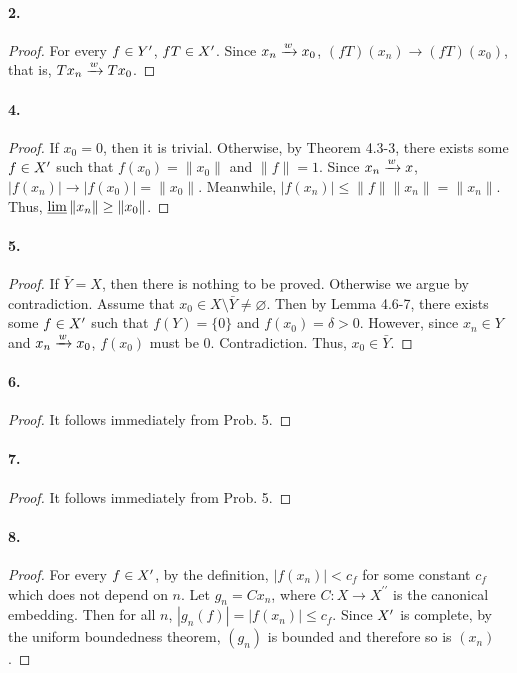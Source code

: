   \paragraph{2.}
  \begin{proof}
    For every $f\in Y^\prime$, $fT\in X^\prime$. Since $x_n\xrightarrow{w} x_0$, $(fT)(x_n)\to (fT)
    (x_0)$, that is, $Tx_n\xrightarrow{w} Tx_0$.
  \end{proof}
  
  \paragraph{4.}
  \begin{proof}
    If $x_0=0$, then it is trivial. Otherwise, by Theorem 4.3-3, there exists 
    some $f\in X^\prime$ such that $f(x_0)=\|x_0\|$ and $\|f\|=1$. Since $x_n\xrightarrow{w}
    x$, $|f(x_n)|\to |f(x_0)|=\|x_0\|$. Meanwhile, $|f(x_n)|\le \|f\|\|x_n\|=\|
    x_n\|$. Thus, $\operatorname*{\underline{lim}}\|x_n\|\ge \|x_0\|$.
  \end{proof}
  
  \paragraph{5.}
  \begin{proof}
    If $\bar{Y}=X$, then there is nothing to be proved. Otherwise we argue by 
    contradiction. Assume that $x_0\in X\setminus\bar{Y}\ne\varnothing$. Then by
    Lemma 4.6-7, there exists some $f\in X^\prime$ such that $f(Y)=\{0\}$ and $f
    (x_0)=\delta>0$. However, since $x_n\in Y$ and $x_n\xrightarrow{w} x_0$, $f(x_0)$ must
    be $0$. Contradiction. Thus, $x_0\in\bar{Y}$.
  \end{proof}
  
  \paragraph{6.}
  \begin{proof}
    It follows immediately from Prob. 5.
  \end{proof}
  
  \paragraph{7.}
  \begin{proof}
    It follows immediately from Prob. 5.
  \end{proof}
  
  \paragraph{8.}
  \begin{proof}
    For every $f\in X^\prime$, by the definition, $|f(x_n)|<c_f$ for some constant
    $c_f$ which does not depend on $n$. Let $g_n=Cx_n$, where $C:X\to X^{\prime
    \prime}$ is the canonical embedding. Then for all $n$, $|g_n(f)|=|f(x_n)|\le
    c_f$. Since $X^\prime$ is complete, by the uniform boundedness theorem, $(g_n)$
    is bounded and therefore so is $(x_n)$.
  \end{proof}
  
